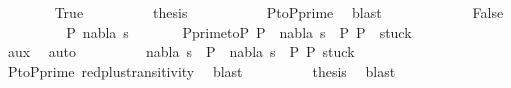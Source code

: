 \begin{isabellebody}
\ \ \ \ \ \ \isamarkupfalse%
\ True\isanewline
\ \ \ \ \ \ \isamarkupfalse%
\ \isamarkupfalse%
\ {\isacharquery}{\kern0pt}thesis\ \isanewline
\ \ \ \ \ \ \ \ \isamarkupfalse%
\ P{\isacharunderscore}{\kern0pt}to{\isacharunderscore}{\kern0pt}P{\isacharunderscore}{\kern0pt}prime\ \isamarkupfalse%
\ blast\isanewline
\ \ \ \ \isamarkupfalse%
\isanewline
\ \ \ \ \ \ \isamarkupfalse%
\ False\isanewline
\ \ \ \ \ \ \isamarkupfalse%
\ \isamarkupfalse%
\ P{}\ nabla{\isacharprime}{\kern0pt}\ s{\isacharprime}{\kern0pt}\ \isanewline
\ \ \ \ \ \ P{\isacharunderscore}{\kern0pt}prime{\isacharunderscore}{\kern0pt}to{\isacharunderscore}{\kern0pt}P{}{\isacharcolon}{\kern0pt}\ {\isachardoublequoteopen}P{\isacharprime}{\kern0pt}\ {\isasymTurnstile}\ {\isacharparenleft}{\kern0pt}nabla{\isacharprime}{\kern0pt}{\isacharcomma}{\kern0pt}\ s{\isacharprime}{\kern0pt}{\isacharparenright}{\kern0pt}\ {\isasymRightarrow}\ P{}{\isachardoublequoteclose}\ {\isachardoublequoteopen}P{}\ {\isasymin}\ stuck{\isachardoublequoteclose}\isanewline
\ \ \ \ \ \ \ \ \isamarkupfalse%
\ aux\ \isamarkupfalse%
\ auto\isanewline
\ \ \ \ \ \ \isamarkupfalse%
\ \isamarkupfalse%
\ nabla{}\ s{}\ \ {\isachardoublequoteopen}P\ {\isasymTurnstile}\ {\isacharparenleft}{\kern0pt}nabla{}{\isacharcomma}{\kern0pt}\ s{}{\isacharparenright}{\kern0pt}\ {\isasymRightarrow}\ P{}{\isachardoublequoteclose}\ {\isachardoublequoteopen}P{}{\isasymin}\ stuck{\isachardoublequoteclose}\isanewline
\ \ \ \ \ \ \ \ \isamarkupfalse%
\ P{\isacharunderscore}{\kern0pt}to{\isacharunderscore}{\kern0pt}P{\isacharunderscore}{\kern0pt}prime\ red{\isacharunderscore}{\kern0pt}plus{\isacharunderscore}{\kern0pt}transitivity\ \isamarkupfalse%
\ blast\isanewline
\ \ \ \ \ \ \isamarkupfalse%
\ \isamarkupfalse%
\ {\isacharquery}{\kern0pt}thesis\ \isamarkupfalse%
\ blast\isanewline
\ \ \ \ \isamarkupfalse%
\isanewline
\ \ \isamarkupfalse%
\isanewline
{}\isamarkupfalse%
%
\endisatagproof
{\isafoldproof}%
%
\isadelimproof
%
\endisadelimproof
%
\begin{isamarkuptext}%

\end{isamarkuptext}
\end{isabellebody}
